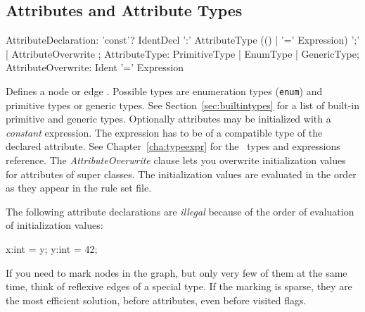 \subsection{Attributes and Attribute Types}
\label{sct:attrtypes}

\begin{rail}
  AttributeDeclaration: 'const'? IdentDecl ':' AttributeType (() | '=' Expression) ';' | AttributeOverwrite ;
  AttributeType: PrimitiveType | EnumType | GenericType;
  AttributeOverwrite: Ident '=' Expression
\end{rail}
Defines a node or edge .
Possible types are enumeration types (\texttt{enum}) and primitive types or generic types.
See Section~\ref{sec:builtintypes} for a list of built-in primitive and generic types.
Optionally attributes may be initialized with a \emph{constant} expression.
The expression has to be of a compatible type of the declared attribute.
See Chapter~\ref{cha:typeexpr} for the \GrG\ types and expressions reference.
The \emph{AttributeOverwrite} clause lets you overwrite initialization values for attributes of super classes.
The initialization values are evaluated in the order as they appear in the rule set file.
\begin{note}
	The following attribute declarations are \emph{illegal} because of the order of evaluation of initialization values:
	\begin{grgen}
x:int = y;
y:int = 42;
	\end{grgen}
\end{note}

\begin{note}
If you need to mark nodes in the graph, but only very few of them at the same time, think of reflexive edges of a special type. If the marking is sparse, they are the most efficient solution, before attributes, even before visited flags.
\end{note}
